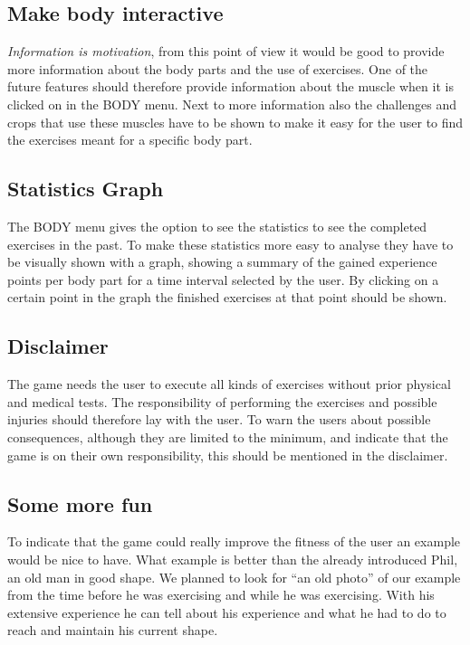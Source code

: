 \subsection{Make body interactive}
\textit{Information is motivation}, from this point of view it would be good to provide more information about the body parts and the use of exercises. One of the future features should therefore provide information about the muscle when it is clicked on in the BODY menu. Next to more information also the challenges and crops that use these muscles have to be shown to make it easy for the user to find the exercises meant for a specific body part. 

\subsection{Statistics Graph}
The BODY menu gives the option to see the statistics to see the completed exercises in the past. To make these statistics more easy to analyse they have to be visually shown with a graph, showing a summary of the gained experience points per body part for a time interval selected by the user. By clicking on a certain point in the graph the finished exercises at that point should be shown.

\subsection{Disclaimer}
The game needs the user to execute all kinds of exercises without prior physical and medical tests. The responsibility of performing the exercises and possible injuries should therefore lay with the user. To warn the users about possible consequences, although they are limited to the minimum, and indicate that the game is on their own responsibility, this should be mentioned in the disclaimer. 

\subsection{Some more fun}
To indicate that the game could really improve the fitness of the user an example would be nice to have. What example is better than the already introduced Phil, an old man in good shape. We planned to look for ``an old photo'' of our example from the time before he was exercising and while he was exercising. With his extensive experience he can tell about his experience and what he had to do to reach and maintain his current shape. 


